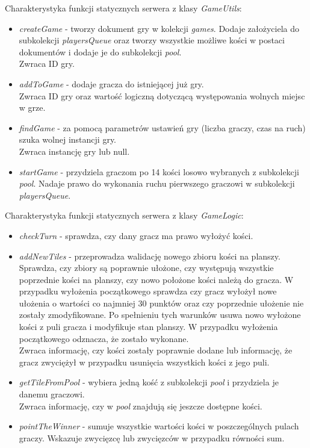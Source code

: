 Charakterystyka funkcji statycznych serwera z klasy \emph{GameUtils}:
\begin{itemize}
	\item \emph{createGame} - tworzy dokument gry w kolekcji \emph{games}. Dodaje założyciela do subkolekcji \emph{playersQueue} oraz tworzy wszystkie możliwe kości w postaci dokumentów i dodaje je do subkolekcji \emph{pool}. \\
	Zwraca ID gry.
	\item \emph{addToGame} - dodaje gracza do istniejącej już gry. \\
	Zwraca ID gry oraz wartość logiczną dotyczącą występowania wolnych miejsc w grze.
	\item \emph{findGame} -  za pomocą parametrów ustawień gry (liczba graczy, czas na ruch) szuka wolnej instancji gry. \\
	Zwraca instancję gry lub null.
	\item \emph{startGame} -  przydziela graczom po 14 kości losowo wybranych z subkolekcji \emph{pool}. Nadaje prawo do wykonania ruchu pierwszego graczowi w subkolekcji \emph{playersQueue}. \\ 
\end{itemize}
Charakterystyka funkcji statycznych serwera z klasy \emph{GameLogic}:
\begin{itemize}
	\item \emph{checkTurn} - sprawdza, czy dany gracz ma prawo wyłożyć kości.
	\item \emph{addNewTiles} - przeprowadza walidację nowego zbioru kości na planszy. Sprawdza, czy zbiory są poprawnie ułożone, czy występują wszystkie poprzednie kości na planszy, czy nowo położone kości należą do gracza. W przypadku wyłożenia początkowego sprawdza czy gracz wyłożył nowe ułożenia o wartości co najmniej 30 punktów oraz czy poprzednie ułożenie nie zostały zmodyfikowane. Po spełnieniu tych warunków usuwa nowo wyłożone kości z puli gracza i modyfikuje stan planszy. W przypadku wyłożenia początkowego odznacza, że zostało wykonane. \\
	Zwraca informację, czy kości zostały poprawnie dodane lub informację, że gracz zwyciężył w przypadku usunięcia wszystkich kości z jego puli.
	\item \emph{getTileFromPool} - wybiera jedną kość z subkolekcji \emph{pool} i przydziela je danemu graczowi. \\
	Zwraca informację, czy w \emph{pool} znajdują się jeszcze dostępne kości.
	\item \emph{pointTheWinner} -  sumuje wszystkie wartości kości w poszczególnych pulach graczy. Wskazuje zwycięzcę lub zwycięzców w przypadku równości sum.
\end{itemize}

